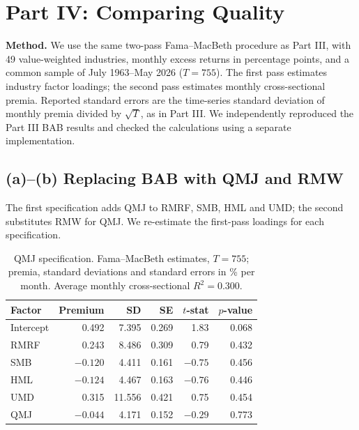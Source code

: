 
\section{Part IV: Comparing Quality}

\noindent\textbf{Method.} We use the same two-pass Fama--MacBeth procedure as Part III,
with 49 value-weighted industries, monthly excess returns in percentage points,
and a common sample of July 1963--May 2026 ($T=755$). The first pass estimates
industry factor loadings; the second pass estimates monthly cross-sectional
premia. Reported standard errors are the time-series standard deviation of
monthly premia divided by $\sqrt{T}$, as in Part III. We independently reproduced
the Part III BAB results and checked the calculations using a separate implementation.

\subsection*{(a)--(b) Replacing BAB with QMJ and RMW}
The first specification adds QMJ to RMRF, SMB, HML and UMD; the second substitutes
RMW for QMJ. We re-estimate the first-pass loadings for each specification.

\begin{table}[H]
\centering
\caption{QMJ specification. Fama--MacBeth estimates, $T=755$; premia, standard deviations and standard errors in \% per month. Average monthly cross-sectional $R^2=0.300$.}
\label{tab:ps7_qmj}
\begin{tabular}{lrrrrr}
\toprule
Factor & Premium & SD & SE & $t$-stat & $p$-value \\
\midrule
Intercept & 0.492 & 7.395 & 0.269 & 1.83 & 0.068 \\
RMRF & 0.243 & 8.486 & 0.309 & 0.79 & 0.432 \\
SMB & $-0.120$ & 4.411 & 0.161 & $-0.75$ & 0.456 \\
HML & $-0.124$ & 4.467 & 0.163 & $-0.76$ & 0.446 \\
UMD & 0.315 & 11.556 & 0.421 & 0.75 & 0.454 \\
QMJ & $-0.044$ & 4.171 & 0.152 & $-0.29$ & 0.773 \\
\bottomrule
\end{tabular}
\end{table}

